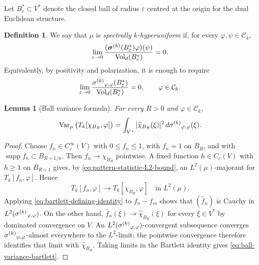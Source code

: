 \documentclass[11pt,reqno,a4paper]{amsart}
\numberwithin{equation}{section}
\theoremstyle{compact}
\newtheorem{lemma}[lemma]{Lemma}
\theoremstyle{definition}
\newtheorem{definition}[definition]{Definition}
\theoremstyle{definition}
\newcommand{\Var}{\operatorname{Var}}
\newcommand{\Vol}{\operatorname{Vol}}
\newcommand{\sigmak}{\smash[t]{\sigma^{(k)}}}
\newcommand{\bsigmak}{\smash[t]{\boldsymbol{\sigma}^{(k)}}}
\begin{document}
Let $B_\varepsilon^*\subset V^*$ denote the closed ball of radius $\varepsilon$
centred at the origin for the dual Euclidean structure.

\begin{definition}\label{def:spectral-k-hu}
We say that $\mu$ is \emph{spectrally $k$-hyperuniform} if, for every
$\varphi,\psi\in\mathcal C_k$,
\begin{equation}\label{eq:spectral-k-hu}
  \lim_{\varepsilon\to0}
  \frac{(\bsigmak(B_\varepsilon^*)\varphi)(\psi)}
       {\Vol_d(B_\varepsilon^*)}=0.
\end{equation}
Equivalently, by positivity and polarization, it is enough to require
\begin{equation}\label{eq:spectral-k-hu-diagonal}
  \lim_{\varepsilon\to0}
  \frac{\sigmak_{\varphi,\varphi}(B_\varepsilon^*)}
       {\Vol_d(B_\varepsilon^*)}=0,
  \qquad \varphi\in\mathcal C_k.
\end{equation}
\end{definition}

\begin{lemma}[Ball variance formula]\label{lem:ball-variance-bartlett}
For every $R>0$ and $\varphi\in\mathcal C_k$,
\begin{equation}\label{eq:ball-variance-bartlett}
  \Var_\mu\big(T_k[\chi_{B_R},\varphi]\big)
  =\int_{V^*}|\widehat{\chi}_{B_R}(\xi)|^2\,
    d\sigmak_{\varphi,\varphi}(\xi).
\end{equation}
\end{lemma}

\begin{proof}
Choose $f_n\in C_c^\infty(V)$ with $0\leq f_n\leq1$, with $f_n=1$ on
$B_R$, and with $\operatorname{supp}f_n\subset B_{R+1/n}$.  Then
$f_n\to\chi_{B_R}$ pointwise.  A fixed function $h\in C_c(V)$ with
$h\geq1$ on $B_{R+1}$ gives, by \eqref{eq:pattern-statistic-L2-bound}, an
$L^2(\mu)$-majorant for $T_k[f_n,\varphi]$.  Hence
\begin{equation}\label{eq:ball-statistic-L2-convergence}
  T_k[f_n,\varphi]\longrightarrow
  T_k[\chi_{B_R},\varphi]
  \quad\text{in }L^2(\mu).
\end{equation}
Applying \eqref{eq:bartlett-defining-identity} to $f_n-f_m$ shows that
$(\widehat f_n)$ is Cauchy in
$L^2(\sigmak_{\varphi,\varphi})$.  On the other hand,
$\widehat f_n(\xi)\to\widehat\chi_{B_R}(\xi)$ for every $\xi\in V^*$ by
dominated convergence on $V$.  An $L^2(\sigmak_{\varphi,\varphi})$-convergent
subsequence converges $\sigmak_{\varphi,\varphi}$-almost everywhere to the
$L^2$-limit; the pointwise convergence therefore identifies that limit with
$\widehat\chi_{B_R}$.  Taking limits in the Bartlett identity gives
\eqref{eq:ball-variance-bartlett}.
\end{proof}
\end{document}
